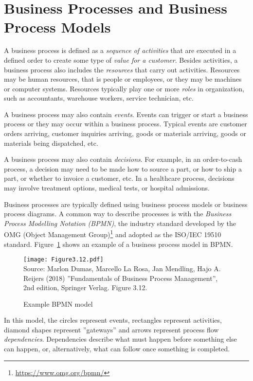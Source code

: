 \section{Business Processes and Business Process Models}

A business process is defined as a \emph{sequence of activities} that are executed in a defined order to create some type of \emph{value for a customer}. Besides activities, a business process also includes the \emph{resources} that carry out activities. Resources may be human resources, that is people or employees, or they may be machines or computer systems. Resources typically play one or more \emph{roles} in organization, such as accountants, warehouse workers, service technician, etc.

A business process may also contain \emph{events}. Events can trigger or start a business process or they may occur within a business process. Typical events are customer orders arriving, customer inquiries arriving, goods or materials arriving, goods or materials being dispatched, etc. 

A business process may also contain \emph{decisions}. For example, in an order-to-cash process, a decision may need to be made how to source a part, or how to ship a part, or whether to invoice a customer, etc. In a healthcare process, decisions may involve treatment options, medical tests, or hospital admissions.

Business processes are typically defined using business process models or business process diagrams. A common way to describe processes is with the \emph{Business Process Modelling Notation (BPMN)}, the industry standard developed by the OMG (Object Management Group)\footnote{\url{https://www.omg.org/bpmn/}} and adopted as the ISO/IEC 19510 standard. Figure~\ref{fig:bpmn} shows an example of a business process model in BPMN.

\begin{figure}
\centering
\texttt{[image: Figure3.12.pdf]} \\

\scriptsize Source: Marlon Dumas, Marcello La Rosa, Jan Mendling, Hajo A. Reijers (2018) ''Fundamentals of Business Process Management'', 2nd edition, Springer Verlag. Figure 3.12.
\caption{Example BPMN model}
\label{fig:bpmn}
\end{figure}

In this model, the circles represent events, rectangles represent activities, diamond shapes represent ''gateways'' and arrows represent process flow \emph{dependencies}. Dependencies describe what must happen before something else can happen, or, alternatively, what can follow once something is completed. 

